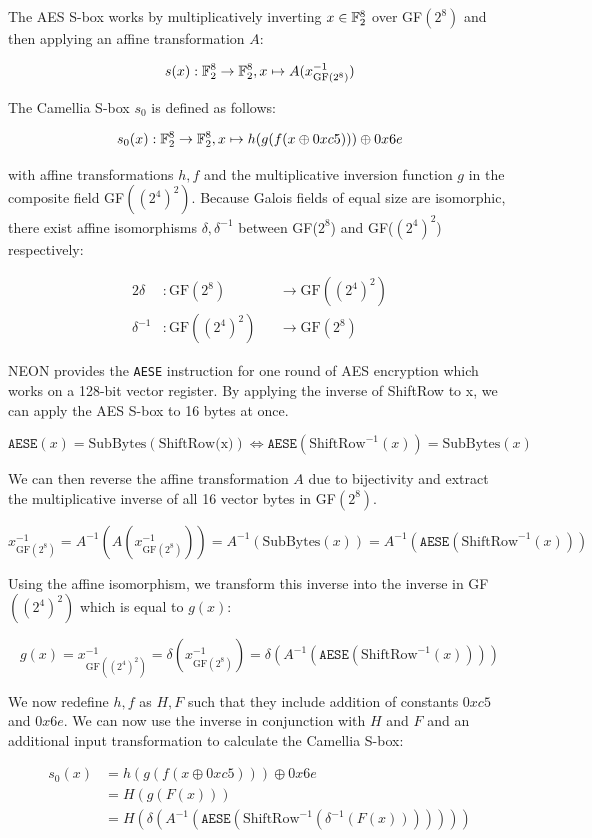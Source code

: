 The AES S-box works by multiplicatively inverting $x\in\mathbb{F}_2^{8}$ over GF$(2^8)$ and then
applying an affine transformation $A$:

\[
    s(x):\mathbb{F}_2^{8}\rightarrow\mathbb{F}_2^{8}, x\mapsto A(x^{-1}_{\text{GF}(2^8)})
\]

The Camellia S-box $s_0$ is defined as follows:

\[
    s_0(x):\mathbb{F}_2^{8}\rightarrow\mathbb{F}_2^{8}, x\mapsto h(g(f(x\oplus 0xc5)))\oplus 0x6e
\]

with affine transformations $h,f$ and the multiplicative inversion function $g$
in the composite field GF$((2^4)^2)$. Because Galois fields of equal size are
isomorphic, there exist affine isomorphisms $\delta,\delta^{-1}$ between
GF($2^8$) and GF($(2^4)^2$) respectively\cite{satohmorioka:2003}:

\begin{alignat*}{2}
    \delta&:\text{GF}(2^8)&&\rightarrow\text{GF}((2^4)^2) \\
    \delta^{-1}&:\text{GF}((2^4)^2)&&\rightarrow\text{GF}(2^8)
\end{alignat*}

NEON provides the \texttt{AESE} instruction for one round of AES encryption
which works on a 128-bit vector register. By applying the inverse of ShiftRow
to x, we can apply the AES S-box to 16 bytes at once.

\[
    \texttt{AESE}(x)=\text{SubBytes}(\text{ShiftRow(x)})\Leftrightarrow \texttt{AESE}(\text{ShiftRow}^{-1}(x))=\text{SubBytes}(x)
\]

We can then reverse the affine transformation $A$ due to bijectivity and
extract the multiplicative inverse of all 16 vector bytes in GF$(2^8)$.

\[
    x^{-1}_{\text{GF}(2^8)}=A^{-1}(A(x^{-1}_{\text{GF}(2^8)}))=A^{-1}(\text{SubBytes}(x))=A^{-1}(\texttt{AESE}(\text{ShiftRow}^{-1}(x)))
\]

Using the affine isomorphism, we transform this inverse into the inverse in
GF$((2^4)^2)$ which is equal to $g(x)$:

\[
    g(x)=x^{-1}_{\text{GF}((2^4)^2)}=\delta(x^{-1}_{\text{GF}(2^8)})=\delta(A^{-1}(\texttt{AESE}(\text{ShiftRow}^{-1}(x))))
\]

We now redefine $h,f$ as $H,F$ such that they include addition of constants
$0xc5$ and $0x6e$. We can now use the inverse in conjunction with $H$ and $F$
and an additional input transformation to calculate the Camellia S-box:

\begin{align*}
    s_0(x)&=h(g(f(x\oplus 0xc5)))\oplus 0x6e \\
          &=H(g(F(x))) \\
          &=H(\delta(A^{-1}(\texttt{AESE}(\text{ShiftRow}^{-1}(\delta^{-1}(F(x)))))))
\end{align*}

